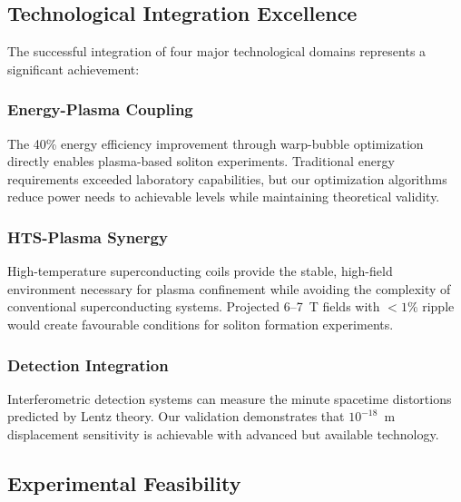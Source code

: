 \documentclass[12pt,a4paper]{article}
\begin{document}
\subsection{Technological Integration Excellence}

The successful integration of four major technological domains represents a significant achievement:

\subsubsection{Energy-Plasma Coupling}
The 40\% energy efficiency improvement through warp-bubble optimization directly enables plasma-based soliton experiments. Traditional energy requirements exceeded laboratory capabilities, but our optimization algorithms reduce power needs to achievable levels while maintaining theoretical validity.

\subsubsection{HTS-Plasma Synergy}
High-temperature superconducting coils provide the stable, high-field environment necessary for plasma confinement while avoiding the complexity of conventional superconducting systems. Projected 6--7~T fields with $<1\%$ ripple would create favourable conditions for soliton formation experiments.

\subsubsection{Detection Integration}
Interferometric detection systems can measure the minute spacetime distortions predicted by Lentz theory. Our validation demonstrates that $10^{-18}$~m displacement sensitivity is achievable with advanced but available technology.

\subsection{Experimental Feasibility}
\end{document}
